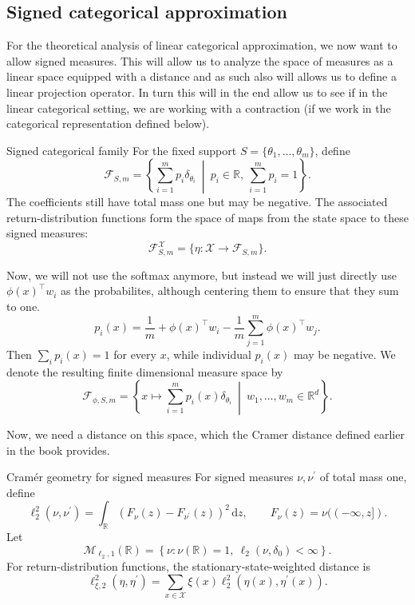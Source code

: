 \documentclass[12pt]{article}
\newcommand{\R}{\mathbb{R}}
\newcommand{\1}{\mathds{1}}
\newcommand{\X}{\mathcal{X}}
\begin{document}
\subsection{Signed categorical approximation}

For the theoretical analysis of linear categorical approximation, we now want to allow signed measures. 
This will allow us to analyze the space of measures as a linear space equipped with a distance and as such also will allows us to define a linear projection operator.
In turn this will in the end allow us to see if in the linear categorical setting, we are working with a contraction (if we work in the categorical representation defined below).

\begin{definition}{Signed categorical family}{}
For the fixed support $S=\{\theta_1,\ldots,\theta_m\}$, define
$$
  \mathcal F_{S,m}
  =
  \left\{
    \sum_{i=1}^m p_i\delta_{\theta_i}
    \ \middle|\
    p_i\in\R,\ \sum_{i=1}^m p_i=1
  \right\}.
$$
The coefficients still have total mass one but may be negative. The associated
return-distribution functions form the space of maps from the state space to these signed measures:
$$
  \mathcal F_{S,m}^{\X}
  =
  \{\eta:\X\to\mathcal F_{S,m}\}.
$$
\end{definition}

Now, we will not use the softmax anymore, but instead we will just directly use $\phi(x)^\top w_i$ as the probabilites, although centering them to ensure that they sum to one. 
$$
  p_i(x)
  =
  \frac1m+\phi(x)^\top w_i
  -\frac1m\sum_{j=1}^m\phi(x)^\top w_j .
$$
Then $\sum_i p_i(x)=1$ for every $x$, while individual $p_i(x)$ may be
negative. We denote the resulting finite dimensional measure space by
$$
  \mathcal F_{\phi,S,m}
  =
  \left\{
    x\mapsto\sum_{i=1}^m p_i(x)\delta_{\theta_i}
    \ \middle|\
    w_1,\ldots,w_m\in\R^d
  \right\}.
$$

Now, we need a distance on this space, which the Cramer distance defined earlier in the book provides.

\begin{definition}{Cram\'er geometry for signed measures}{}
For signed measures $\nu,\nu^{\prime}$ of total mass one, define
$$
  \ell_2^2(\nu,\nu^{\prime})
  =
  \int_\R\left(F_\nu(z)-F_{\nu^{\prime}}(z)\right)^2\,\mathrm dz,
  \qquad
  F_\nu(z)=\nu((-\infty,z]).
$$
Let
$$
  \mathcal M_{\ell_2,1}(\R)
  =
  \left\{
    \nu:\nu(\R)=1,\ \ell_2(\nu,\delta_0)<\infty
  \right\}.
$$
For return-distribution functions, the stationary-state-weighted distance is
$$
  \ell_{\xi,2}^2(\eta,\eta^{\prime})
  =
  \sum_{x\in\X}\xi(x)
  \ell_2^2\!\left(\eta(x),\eta^{\prime}(x)\right).
$$
\end{definition}
\end{document}

